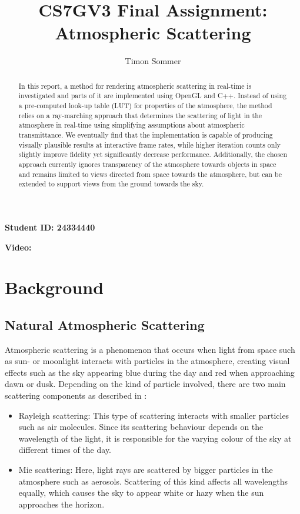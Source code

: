\documentclass[12pt]{article}
\begin{document}
\author{Timon Sommer}
\title{CS7GV3 Final Assignment: \\ Atmospheric Scattering}
\date{}
\maketitle

\textbf{Student ID: 24334440}

\textbf{Video: \url{}}

\medskip

\begin{abstract}
In this report, a method for rendering atmospheric scattering in real-time is investigated and parts of it are implemented using OpenGL and C++.
Instead of using a pre-computed look-up table (LUT) for properties of the atmosphere, the method relies on a ray-marching approach that determines the scattering of light in the atmosphere in real-time using simplifying assumptions about atmospheric transmittance.
We eventually find that the implementation is capable of producing visually plausible results at interactive frame rates, while higher iteration counts only slightly improve fidelity yet significantly decrease performance.
Additionally, the chosen approach currently ignores transparency of the atmosphere towards objects in space and remains limited to views directed from space towards the atmosphere, but can be extended to support views from the ground towards the sky.

\end{abstract}

\section{Background}
\subsection{Natural Atmospheric Scattering}
Atmospheric scattering is a phenomenon that occurs when light from space such as sun- or moonlight interacts with particles in the atmosphere, creating visual effects such as the sky appearing blue during the day and red when approaching dawn or dusk.
Depending on the kind of particle involved, there are two main scattering components as described in \cite{bruneton_precomputed_2008}:
\begin{itemize}
    \item Rayleigh scattering: This type of scattering interacts with smaller particles such as air molecules.
    Since its scattering behaviour depends on the wavelength of the light, it is responsible for the varying colour of the sky at different times of the day.
    \item Mie scattering: Here, light rays are scattered by bigger particles in the atmosphere such as aerosols.
    Scattering of this kind affects all wavelengths equally, which causes the sky to appear white or hazy when the sun approaches the horizon.
\end{itemize}
\end{document}
